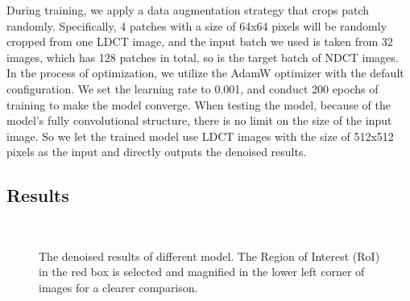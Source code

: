\documentclass[conference]{IEEEtran}
\begin{document}
            During training, we apply a data augmentation strategy that crops patch randomly.
            Specifically, 4 patches with a size of 64x64 pixels will be randomly cropped from one LDCT image, and the input batch we used is taken from 32 images, which has 128 patches in total, so is the target batch of NDCT images.
            In the process of optimization, we utilize the AdamW optimizer\cite{loshchilov2018fixing} with the default configuration.
            We set the learning rate to 0.001, and conduct 200 epochs of training to make the model converge.
            When testing the model, because of the model's fully convolutional structure, there is no limit on the size of the input image. 
            So we let the trained model use LDCT images with the size of 512x512 pixels as the input and directly outputs the denoised results.

        \subsection{Results}
            \begin{figure*}[t]
                \hspace{0.01\linewidth}
                \hspace{0.01\linewidth}
                \\
                \hspace{0.01\linewidth}
                \hspace{0.01\linewidth}
                \caption{The denoised results of different model. The Region of Interest (RoI) in the red box is selected and magnified in the lower left corner of images for a clearer comparison.}
                \label{denoised_result_comparison}
            \end{figure*}
\end{document}
